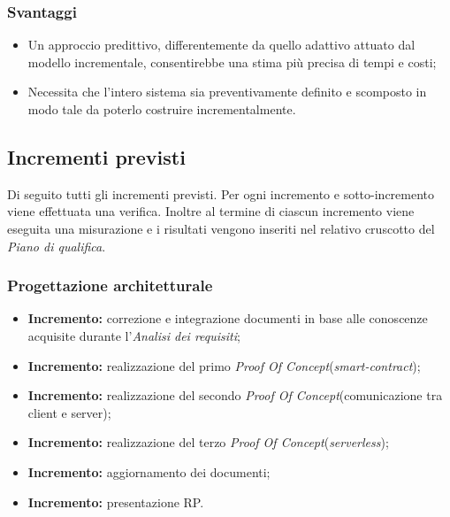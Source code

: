 \subsubsection{Svantaggi}
\begin{itemize}
	\item Un approccio predittivo, differentemente da quello adattivo attuato dal modello incrementale, consentirebbe una stima più precisa di tempi e costi;
	\item Necessita che l'intero sistema sia preventivamente definito e scomposto in modo tale da poterlo costruire incrementalmente.
\end{itemize}
\subsection{Incrementi previsti}
Di seguito tutti gli incrementi previsti. Per ogni incremento e sotto-incremento viene effettuata una verifica. Inoltre al termine di ciascun incremento viene eseguita una misurazione e i risultati vengono inseriti nel relativo cruscotto del \textit{Piano di qualifica}\docs.
\subsubsection{Progettazione architetturale}
\begin{itemize}
  \item \textbf{ Incremento:} correzione e integrazione documenti in base alle conoscenze acquisite durante l'\textit{Analisi dei requisiti}\docs;
  \item \textbf{ Incremento:} realizzazione del primo \textit{Proof Of Concept}\glo (\textit{smart-contract}\glos);
  \item \textbf{ Incremento:} realizzazione del secondo \textit{Proof Of Concept}\glo (comunicazione tra client e server);
  \item \textbf{ Incremento:} realizzazione del terzo \textit{Proof Of Concept}\glo (\textit{serverless}\glos);
  \item \textbf{ Incremento:} aggiornamento dei documenti;
  \item \textbf{ Incremento:} presentazione RP.
\end{itemize}
